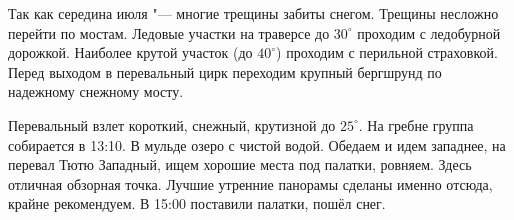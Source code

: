     Так как середина июля "--- многие трещины забиты снегом. Трещины несложно перейти по мостам. Ледовые участки на
    траверсе до $30^\circ$ проходим с ледобурной дорожкой. Наиболее крутой участок (до $40^\circ$) проходим с
    перильной страховкой. Перед выходом в перевальный цирк переходим крупный бергшрунд по надежному снежному мосту.

    Перевальный взлет короткий, снежный, крутизной до $25^\circ$. На гребне группа собирается в 13:10. В мульде
    озеро с чистой водой. Обедаем и идем западнее, на перевал Тютю Западный, ищем хорошие места под палатки, ровняем.
    Здесь отличная обзорная точка. Лучшие утренние панорамы сделаны именно отсюда, крайне рекомендуем. В 15:00
    поставили палатки, пошёл снег.

    \FloatBarrier
    
    
    
    
    
    
    
    
    
    
    
    
    
